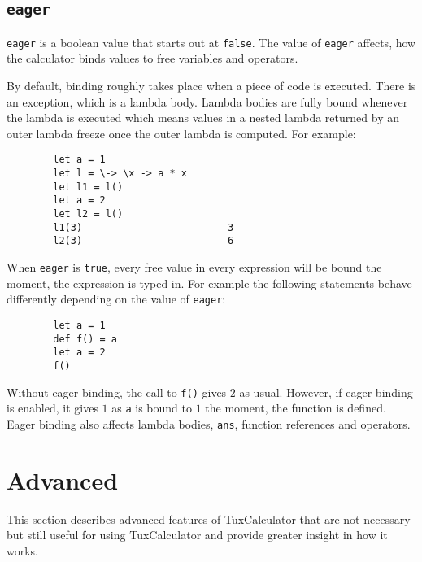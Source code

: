\documentclass[10pt]{article}
\begin{document}
    \subsection{\texttt{eager}}\label{subsec:eager}
    \verb|eager| is a boolean value that starts out at \verb|false|.
    The value of \verb|eager| affects, how the calculator binds values to free variables and operators.
    
    By default, binding roughly takes place when a piece of code is executed.
    There is an exception, which is a lambda body.
    Lambda bodies are fully bound whenever the lambda is executed which means values in a nested lambda returned by an outer lambda freeze once the outer lambda is computed.
    For example:
    \begin{verbatim}
        let a = 1
        let l = \-> \x -> a * x
        let l1 = l()
        let a = 2
        let l2 = l()
        l1(3)                         3
        l2(3)                         6
    \end{verbatim}
    When \verb|eager| is \verb|true|, every free value in every expression will be bound the moment, the expression is typed in.
    For example the following statements behave differently depending on the value of \verb|eager|:
    \begin{verbatim}
        let a = 1
        def f() = a
        let a = 2
        f()
    \end{verbatim}
    Without eager binding, the call to \verb|f()| gives $ 2 $ as usual.
    However, if eager binding is enabled, it gives $ 1 $ as \verb|a| is bound to $ 1 $ the moment, the function is defined.
    Eager binding also affects lambda bodies, \verb|ans|, function references and operators.
    
    \section{Advanced}\label{sec:advanced}
    This section describes advanced features of TuxCalculator that are not necessary but still useful for using TuxCalculator and provide greater insight in how it works.
    
\end{document}
